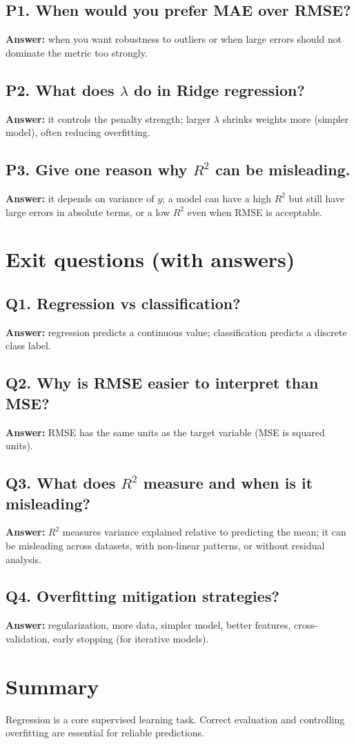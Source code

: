 \documentclass[11pt]{article}
\begin{document}
\subsection*{P1. When would you prefer MAE over RMSE?}
\textbf{Answer:} when you want robustness to outliers or when large errors should not dominate the metric too strongly.

\subsection*{P2. What does $\lambda$ do in Ridge regression?}
\textbf{Answer:} it controls the penalty strength; larger $\lambda$ shrinks weights more (simpler model), often reducing overfitting.

\subsection*{P3. Give one reason why $R^2$ can be misleading.}
\textbf{Answer:} it depends on variance of $y$; a model can have a high $R^2$ but still have large errors in absolute terms, or a low $R^2$ even when RMSE is acceptable.

\section{Exit questions (with answers)}

\subsection*{Q1. Regression vs classification?}
\textbf{Answer:} regression predicts a continuous value; classification predicts a discrete class label.

\subsection*{Q2. Why is RMSE easier to interpret than MSE?}
\textbf{Answer:} RMSE has the same units as the target variable (MSE is squared units).

\subsection*{Q3. What does $R^2$ measure and when is it misleading?}
\textbf{Answer:} $R^2$ measures variance explained relative to predicting the mean; it can be misleading across datasets, with non-linear patterns, or without residual analysis.

\subsection*{Q4. Overfitting mitigation strategies?}
\textbf{Answer:} regularization, more data, simpler model, better features, cross-validation, early stopping (for iterative models).

\section{Summary}
Regression is a core supervised learning task. Correct evaluation and controlling overfitting are essential for reliable predictions.
\notesources{\AIMLUnitIVSources}
\end{document}
